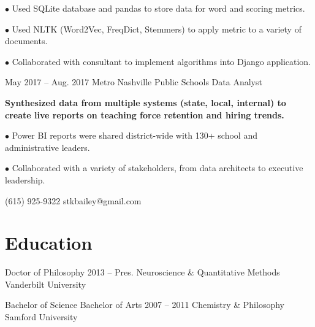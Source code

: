 \documentclass{tccv}
\begin{document}
\begin{eventlist}
\begin{factlist}
    \item{$\bullet$}
         {Used SQLite database and pandas to store data for word and scoring metrics.}

    \item{$\bullet$}
         {Used NLTK (Word2Vec, FreqDict, Stemmers) to apply metric to a variety of documents.}
         
    \item{$\bullet$}
         {Collaborated with consultant to implement algorithms into Django application.}
\end{factlist}

\item{May 2017 -- Aug. 2017}
     {Metro Nashville Public Schools}
     {Data Analyst}

    \textbf{Synthesized data from multiple systems (state, local, internal) to create live reports on teaching force retention and hiring trends.} 
    \newline

\begin{factlist}
    \item{$\bullet$}
         {Power BI reports were shared district-wide with 130+ school and administrative leaders.}
         
    \item{$\bullet$}
         {Collaborated with a variety of stakeholders, from data architects to executive leadership.}
\end{factlist}



\end{eventlist}



    {(615) 925-9322}
    {stkbailey@gmail.com}

\section{Education}

\begin{yearlist}

\item[Doctor of Philosophy]{2013 -- Pres.}
     {Neuroscience \& \newline Quantitative Methods}
     {Vanderbilt University}
\item[Bachelor of Science \newline Bachelor of Arts]{2007 -- 2011}
     {Chemistry \& Philosophy}
     {Samford University}

\end{yearlist}
\end{document}
